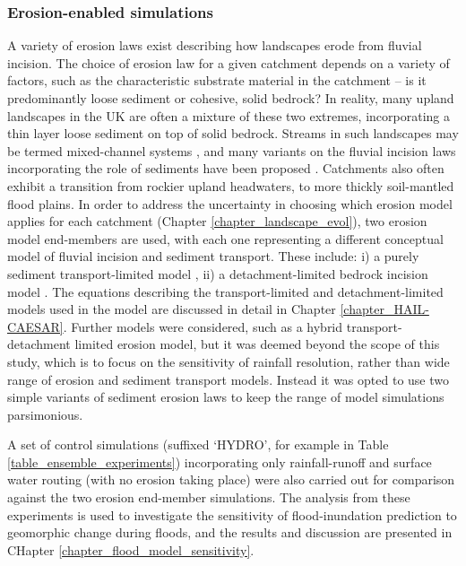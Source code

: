 \subsubsection{Erosion-enabled simulations}
A variety of erosion laws exist describing how landscapes erode from fluvial incision. The choice of erosion law for a given catchment depends on a variety of factors, such as the characteristic substrate material in the catchment -- is it predominantly loose sediment or cohesive, solid bedrock? In reality, many upland landscapes in the UK are often a mixture of these two extremes, incorporating a thin layer loose sediment on top of solid bedrock. Streams in such landscapes may be termed mixed-channel systems \citep{howard1998long}, and many variants on the fluvial incision laws incorporating the role of sediments have been proposed \citep{Lague2005,sklar2006role}. Catchments also often exhibit a transition from rockier upland headwaters, to more thickly soil-mantled flood plains. In order to address the uncertainty in choosing which erosion model applies for each catchment (Chapter \ref{chapter_landscape_evol}), two erosion model end-members are used, with each one representing a different conceptual model of fluvial incision and sediment transport. These include: i) a purely sediment transport-limited model \citep{wilcock2003surface}, ii) a detachment-limited bedrock incision model \citep{howard1983channel,stock1999geologic,whipple1999dynamics}. The equations describing the transport-limited and detachment-limited models used in the model are discussed in detail in Chapter \ref{chapter_HAIL-CAESAR}. Further models were considered, such as a hybrid transport-detachment limited erosion model, but it was deemed beyond the scope of this study, which is to focus on the sensitivity of rainfall resolution, rather than wide range of erosion and sediment transport models. Instead it was opted to use two simple variants of sediment erosion laws to keep the range of model simulations parsimonious. 

A set of control simulations (suffixed `HYDRO', for example in Table \ref{table_ensemble_experiments}) incorporating only rainfall-runoff and surface water routing (with no erosion taking place) were also carried out for comparison against the two erosion end-member simulations. The analysis from these experiments is used to investigate the sensitivity of flood-inundation prediction to geomorphic change during floods, and the results and discussion are presented in CHapter \ref{chapter_flood_model_sensitivity}.

